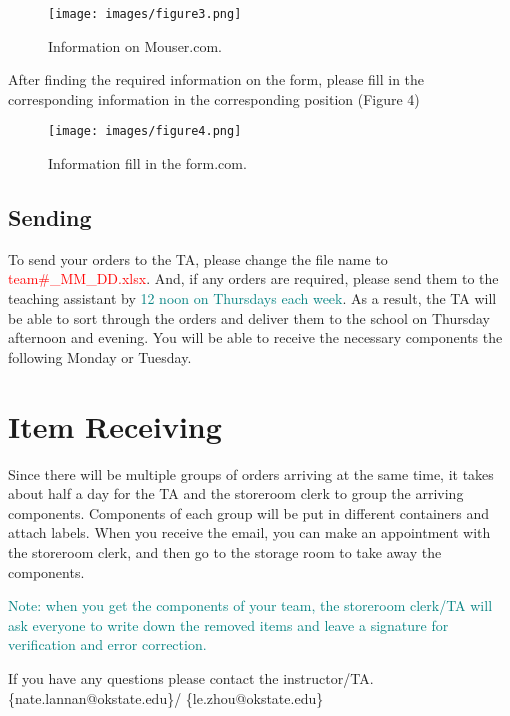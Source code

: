 \documentclass[10pt,oneside,fleqn]{article}
\newcommand{\gray}{\textcolor{gray!60}}
\newcommand{\name}{Le Zhou}
\begin{document}
\begin{figure}[H]
    \centering
    \texttt{[image: images/figure3.png]}
    \caption{Information on Mouser.com.}
\end{figure} \vspace{-5mm}
After finding the required information on the form, please fill in the corresponding information in the corresponding position (Figure 4)
\begin{figure}[H]
    \centering
    \texttt{[image: images/figure4.png]}
    \caption{Information fill in the form.com.}
\end{figure} \vspace{-5mm}
\subsection{Sending}
To send your orders to the TA, please change the file name to \textcolor{red}{team\#\_MM\_DD.xlsx}. And, if any orders are required, please send them to the teaching assistant by \textcolor{teal}{12 noon on Thursdays each week}. As a result, the TA will be able to sort through the orders and deliver them to the school on Thursday afternoon and evening. You will be able to receive the necessary components the following Monday or Tuesday.
\section{Item Receiving}
Since there will be multiple groups of orders arriving at the same time, it takes about half a day for the TA and the storeroom clerk to group the arriving components. Components of each group will be put in different containers and attach labels. When you receive the email, you can make an appointment with the storeroom clerk, and then go to the storage room to take away the components.

\textcolor{teal}{Note: when you get the components of your team, the storeroom clerk/TA will ask everyone to write down the removed items and leave a signature for verification and error correction.}

If you have any questions please contact the instructor/TA. \{nate.lannan@okstate.edu\}/ \{le.zhou@okstate.edu\}

\end{document}
